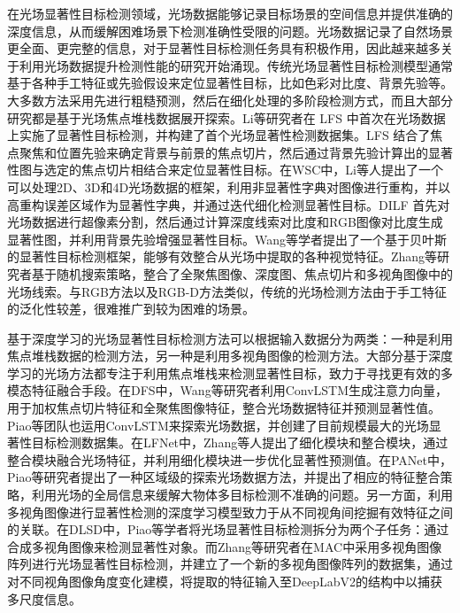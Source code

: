 

在光场显著性目标检测领域，光场数据能够记录目标场景的空间信息并提供准确的深度信息，从而缓解困难场景下检测准确性受限的问题。光场数据记录了自然场景更全面、更完整的信息，对于显著性目标检测任务具有积极作用，因此越来越多关于利用光场数据提升检测性能的研究开始涌现。传统光场显著性目标检测模型通常基于各种手工特征或先验假设来定位显著性目标，比如色彩对比度、背景先验等。大多数方法采用先进行粗糙预测，然后在细化处理的多阶段检测方式，而且大部分研究都是基于光场焦点堆栈数据展开探索。Li等研究者在 LFS 中首次在光场数据上实施了显著性目标检测，并构建了首个光场显著性检测数据集。LFS 结合了焦点聚焦和位置先验来确定背景与前景的焦点切片，然后通过背景先验计算出的显著性图与选定的焦点切片相结合来定位显著性目标。在WSC中，Li等人提出了一个可以处理2D、3D和4D光场数据的框架，利用非显著性字典对图像进行重构，并以高重构误差区域作为显著性字典，并通过迭代细化检测显著性目标。DILF 首先对光场数据进行超像素分割，然后通过计算深度线索对比度和RGB图像对比度生成显著性图，并利用背景先验增强显著性目标。Wang等学者提出了一个基于贝叶斯的显著性目标检测框架，能够有效整合从光场中提取的各种视觉特征。Zhang等研究者基于随机搜索策略，整合了全聚焦图像、深度图、焦点切片和多视角图像中的光场线索。与RGB方法以及RGB-D方法类似，传统的光场检测方法由于手工特征的泛化性较差，很难推广到较为困难的场景。



基于深度学习的光场显著性目标检测方法可以根据输入数据分为两类：一种是利用焦点堆栈数据的检测方法，另一种是利用多视角图像的检测方法。大部分基于深度学习的光场方法都专注于利用焦点堆栈来检测显著性目标，致力于寻找更有效的多模态特征融合手段。在DFS中，Wang等研究者利用ConvLSTM生成注意力向量，用于加权焦点切片特征和全聚焦图像特征，整合光场数据特征并预测显著性值。Piao等团队也运用ConvLSTM来探索光场数据，并创建了目前规模最大的光场显著性目标检测数据集。在LFNet中，Zhang等人提出了细化模块和整合模块，通过整合模块融合光场特征，并利用细化模块进一步优化显著性预测值。在PANet中，Piao等研究者提出了一种区域级的探索光场数据方法，并提出了相应的特征整合策略，利用光场的全局信息来缓解大物体多目标检测不准确的问题。另一方面，利用多视角图像进行显著性检测的深度学习模型致力于从不同视角间挖掘有效特征之间的关联。在DLSD中，Piao等学者将光场显著性目标检测拆分为两个子任务：通过合成多视角图像来检测显著性对象。而Zhang等研究者在MAC中采用多视角图像阵列进行光场显著性目标检测，并建立了一个新的多视角图像阵列的数据集，通过对不同视角图像角度变化建模，将提取的特征输入至DeepLabV2的结构中以捕获多尺度信息。



